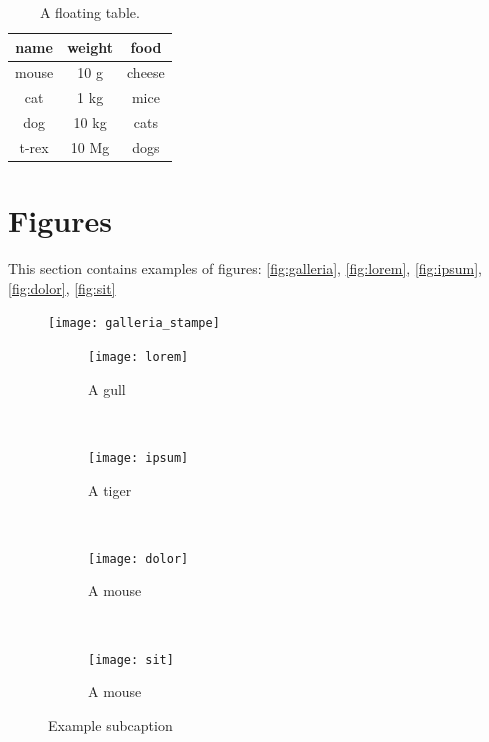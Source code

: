 {{{\begin{table}[H]
	\centering
	\begin{tabular}{ccc}
		\toprule
		name & weight & food \\ 
		\midrule
		mouse	& 10 g	& cheese \\
		cat	& 1 kg	& mice \\
		dog	& 10 kg	& cats \\
		t-rex	& 10 Mg	& dogs \\
		\bottomrule 
	\end{tabular}
	\caption[A floating table]{A floating table.}
	\label{tab:esempio}
\end{table}

\section{Figures}

This section contains examples of figures: \autoref{fig:galleria}, \autoref{fig:lorem}, \autoref{fig:ipsum}, \autoref{fig:dolor}, \autoref{fig:sit}

\begin{figure}[H] 
	\centering 
	\texttt{[image: galleria\_stampe]} 
	\label{fig:galleria} 
\end{figure}

\begin{figure}[H]
	\centering
	\begin{subfigure}[b]{0.45\textwidth}
		\texttt{[image: lorem]}
		\caption{A gull}
		\label{fig:lorem}
	\end{subfigure}
	~ %
	\begin{subfigure}[b]{0.45\textwidth}
		\texttt{[image: ipsum]}
		\caption{A tiger}
		\label{fig:ipsum}
	\end{subfigure}
	~ %
	\begin{subfigure}[b]{0.45\textwidth}
		\texttt{[image: dolor]}
		\caption{A mouse}
		\label{fig:dolor}
	\end{subfigure}
	~ %
	\begin{subfigure}[b]{0.45\textwidth}
		\texttt{[image: sit]}
		\caption{A mouse}
		\label{fig:sit}
	\end{subfigure}
	\caption{Example subcaption}\label{fig:animals}
\end{figure}


}}}
